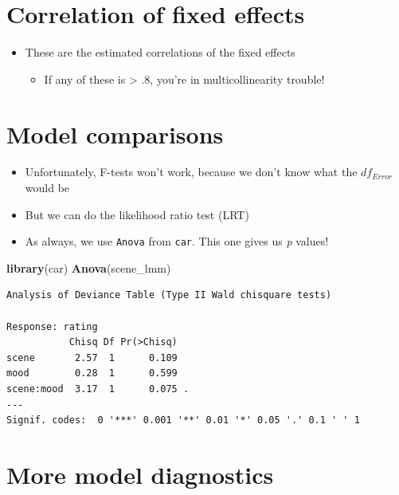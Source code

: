\documentclass[]{article}
\newenvironment{Shaded}{}{}
\newcommand{\KeywordTok}[1]{\textcolor[rgb]{0.00,0.44,0.13}{\textbf{{#1}}}}
\newcommand{\NormalTok}[1]{{#1}}
\begin{document}
\section{Correlation of fixed
effects}\label{correlation-of-fixed-effects}

\begin{itemize}
\itemsep1pt\parskip0pt
\item
  These are the estimated correlations of the fixed effects

  \begin{itemize}
  \itemsep1pt\parskip0pt
  \item
    If any of these is \textgreater{} .8, you're in multicollinearity
    trouble!
  \end{itemize}
\end{itemize}

\section{Model comparisons}\label{model-comparisons-1}

\begin{itemize}
\itemsep1pt\parskip0pt
\item
  Unfortunately, F-tests won't work, because we don't know what the
  $df_{Error}$ would be
\item
  But we can do the likelihood ratio test (LRT)
\item
  As always, we use \texttt{Anova} from \texttt{car}. This one gives us
  \emph{p} values!
\end{itemize}

\begin{Shaded}
\begin{Highlighting}[]
\KeywordTok{library}\NormalTok{(car)}
\KeywordTok{Anova}\NormalTok{(scene_lmm)}
\end{Highlighting}
\end{Shaded}

\begin{verbatim}
Analysis of Deviance Table (Type II Wald chisquare tests)

Response: rating
           Chisq Df Pr(>Chisq)  
scene       2.57  1      0.109  
mood        0.28  1      0.599  
scene:mood  3.17  1      0.075 .
---
Signif. codes:  0 '***' 0.001 '**' 0.01 '*' 0.05 '.' 0.1 ' ' 1
\end{verbatim}

\section{More model diagnostics}\label{more-model-diagnostics}
\end{document}
